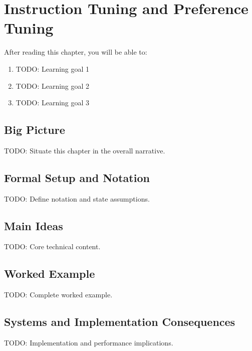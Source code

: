 \chapter{Instruction Tuning and Preference Tuning}
\label{ch:24}

\begin{keyinsight}
After reading this chapter, you will be able to:
\begin{enumerate}
  \item TODO: Learning goal 1
  \item TODO: Learning goal 2
  \item TODO: Learning goal 3
\end{enumerate}
\end{keyinsight}

\section{Big Picture}
\label{ch:24:sec:big_picture}

TODO: Situate this chapter in the overall narrative.

\section{Formal Setup and Notation}
\label{ch:24:sec:setup}

TODO: Define notation and state assumptions.

\section{Main Ideas}
\label{ch:24:sec:main}

TODO: Core technical content.

\section{Worked Example}
\label{ch:24:sec:example}

TODO: Complete worked example.

\section{Systems and Implementation Consequences}
\label{ch:24:sec:systems}

TODO: Implementation and performance implications.

